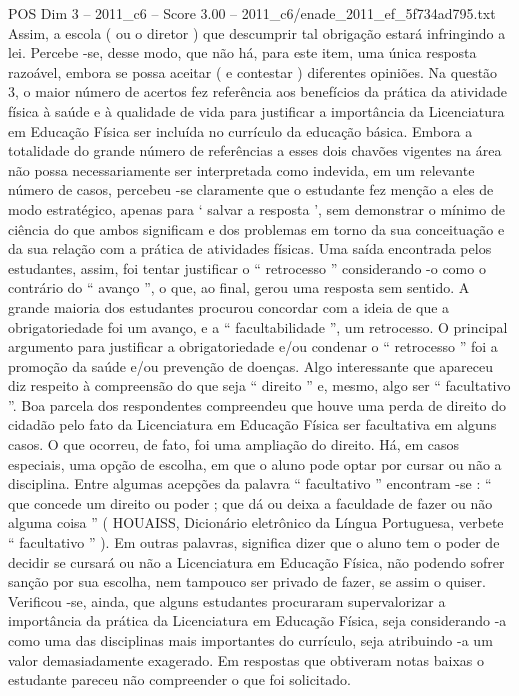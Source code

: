 \begin{textsample}{POS Dim 3 – 2011\_c6 – Score 3.00 – 2011\_c6/enade\_2011\_ef\_5f734ad795.txt}
Assim, a escola ( ou o diretor ) que descumprir tal obrigação estará infringindo a lei.
Percebe -se, desse modo, que não há, para este item, uma única resposta razoável, embora se possa aceitar ( e contestar ) diferentes opiniões.
Na questão 3, o maior número de acertos fez referência aos benefícios da prática da atividade física à saúde e à qualidade de vida para justificar a importância da Licenciatura em Educação Física ser incluída no currículo da educação básica.
Embora a totalidade do grande número de referências a esses dois chavões vigentes na área não possa necessariamente ser interpretada como indevida, em um relevante número de casos, percebeu -se claramente que o estudante fez menção a eles de modo estratégico, apenas para ‘ salvar a resposta ’, sem demonstrar o mínimo de ciência do que ambos significam e dos problemas em torno da sua conceituação e da sua relação com a prática de atividades físicas.
Uma saída encontrada pelos estudantes, assim, foi tentar justificar o “ retrocesso ” considerando -o como o contrário do “ avanço ”, o que, ao final, gerou uma resposta sem sentido.
A grande maioria dos estudantes procurou concordar com a ideia de que a obrigatoriedade foi um avanço, e a “ facultabilidade ”, um retrocesso.
O principal argumento para justificar a obrigatoriedade e/ou condenar o “ retrocesso ” foi a promoção da saúde e/ou prevenção de doenças.
Algo interessante que apareceu diz respeito à compreensão do que seja “ direito ” e, mesmo, algo ser “ facultativo ”.
Boa parcela dos respondentes compreendeu que houve uma perda de direito do cidadão pelo fato da Licenciatura em Educação Física ser facultativa em alguns casos.
O que ocorreu, de fato, foi uma ampliação do direito.
Há, em casos especiais, uma opção de escolha, em que o aluno pode optar por cursar ou não a disciplina.
Entre algumas acepções da palavra “ facultativo ” encontram -se : “ que concede um direito ou poder ; que dá ou deixa a faculdade de fazer ou não alguma coisa ” ( HOUAISS, Dicionário eletrônico da Língua Portuguesa, verbete “ facultativo ” ).
Em outras palavras, significa dizer que o aluno tem o poder de decidir se cursará ou não a Licenciatura em Educação Física, não podendo sofrer sanção por sua escolha, nem tampouco ser privado de fazer, se assim o quiser.
Verificou -se, ainda, que alguns estudantes procuraram supervalorizar a importância da prática da Licenciatura em Educação Física, seja considerando -a como uma das disciplinas mais importantes do currículo, seja atribuindo -a um valor demasiadamente exagerado.
Em respostas que obtiveram notas baixas o estudante pareceu não compreender o que foi solicitado.

\end{textsample}
